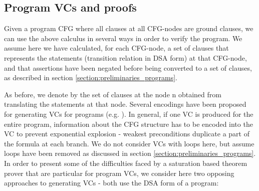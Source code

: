 \subsection*{Program VCs and proofs}
Given a program CFG where all clauses at all CFG-nodes are ground clauses, we can use the above calculus in several ways in order to verify the program.
We assume here we have calculated, for each CFG-node, a set of clauses that represents the statements (transition relation in DSA form) at that CFG-node, 
and that assertions have been negated before being converted to a set of clauses, as described in section \ref{section:preliminaries_programs}.

As before, we denote by  the set of clauses at the node n obtained from translating the statements at that node.
Several encodings have been proposed for generating VCs for programs (e.g. \cite{Leino:2005:EWP:1066417.1710882}). 
In general, if one VC is produced for the entire program, information about the CFG structure has to be encoded into the VC to prevent exponential explosion - weakest preconditions duplicate a part of the formula at each branch. We do not consider VCs with loops here, but assume loops have been removed as discussed in section \ref{section:preliminaries_programs}.
In order to present some of the difficulties faced by a saturation based theorem prover that are particular for program VCs, we consider here two opposing approaches to generating VCs - both use the DSA form of a program:
